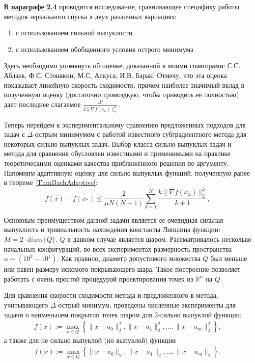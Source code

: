 \underline{\textbf{В параграфе 2.4}} проводится исследование, сравнивающее специфику работы методов зеркального спуска в двух различных вариациях: 
\begin{enumerate}
    \item с использованием сильной выпуклости
    \item с использованием обобщенного условия острого минимума
\end{enumerate}

Здесь необходимо упомянуть об оценке, доказанной в \cite{sharp22} моими соавторами: С.С. Аблаев, Ф.С. Стонякин, М.С. Алкуса, И.В. Баран. Отмечу, что эта оценка показывает линейную скорость сходимости, причем наиболее значимый вклад в полученную оценку (достаточно громоздкую, чтобы приводить ее полностью) дает последнее слагаемое $\frac{\Delta^2}{2\|\nabla f(x_k)\|^2_2}$. 

Теперь перейдём к экспериментальному сравнению предложенных подходов для задач с $\Delta$-острым минимумом с работой известного субградиентного метода \cite{Bach_2012} для некоторых сильно выпуклых задач. Выбор класса сильно выпуклых задач и метода \cite{Bach_2012} для сравнения обусловлен известными и  применимыми на практике теоретическими оценками качества приближённого решения по аргументу. Напомним адаптивную оценку для сильно выпуклых функций, полученную ранее в теореме \ref{ThmBachAdaptive}:
\begin{equation}
    f(\widehat{x}) - f(x_*) \leq \frac{2}{\mu N (N+1)} \sum_{k=1}^{N} \frac{k \|\nabla f(x_k)\|_2^2}{k+1},
\end{equation} 

Основным преимуществом данной задачи является ее очевидная сильная выпуклость и тривиальность нахождения константы Липшица функции: $ M = 2 \cdot diam\{Q\} $. $Q$ в данном случае является шаром.
Рассматривалось несколько начальных конфигураций, во всех экспериментах размерность пространства $n \sim (10^3 - 10^4)$. Как правило, диаметр допустимого множества $Q$ был меньше или равен размеру искомого покрывающего шара. Такое построение позволяет работать с очень простой процедурой проектирования точек из $\mathbb{R}^n$ на $Q$.

Для сравнения скорости сходимости метода \cite{Bach_2012} и предложенного в \cite{sharp22} метода, учитывающего $\Delta$-острый минимум, проведены численные эксперименты для задачи о наименьшем покрытии точек шаром для $2$-сильно выпуклой функции:
\begin{gather}\label{sphere_cover_strongly}
    f(x) := \max_{x\in Q}\left\{\|x - a_0\|_2^2, \|x - a_1\|_2^2, ..., \|x - a_m\|_2^2\right\},
\end{gather}
а также для не сильно выпуклой (но выпуклой) функции
\begin{gather}\label{sphere_cover}
    f(x) := \max_{x\in Q}\left\{\|x - a_0\|_2, \|x - a_1\|_2, ..., \|x - a_m\|_2\right\}.
\end{gather}

